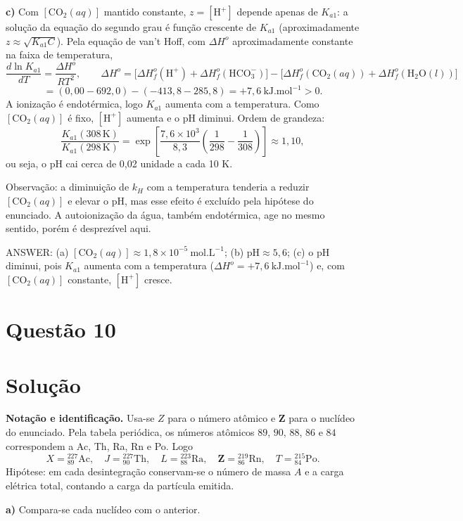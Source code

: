 \documentclass{article}%
\begin{document}
\textbf{c)} Com $[\text{CO}_2(aq)]$ mantido constante, $z=[\text{H}^+]$ depende apenas de $K_{a1}$: a solução da equação do segundo grau é função crescente de $K_{a1}$ (aproximadamente $z\approx\sqrt{K_{a1}C}$). Pela equação de van't Hoff, com $\Delta H^o$ aproximadamente constante na faixa de temperatura,
\[
\frac{d\ln K_{a1}}{dT}=\frac{\Delta H^o}{RT^2},\qquad \Delta H^o=\big[\Delta H^o_f(\text{H}^+)+\Delta H^o_f(\text{HCO}_3^-)\big]-\big[\Delta H^o_f(\text{CO}_2(aq))+\Delta H^o_f(\text{H}_2\text{O}(l))\big]
\]
\[
=(0{,}00-692{,}0)-(-413{,}8-285{,}8)=+7{,}6\ \text{kJ.mol}^{-1}>0.
\]
A ionização é endotérmica, logo $K_{a1}$ aumenta com a temperatura. Como $[\text{CO}_2(aq)]$ é fixo, $[\text{H}^+]$ aumenta e o pH diminui. Ordem de grandeza:
\[
\frac{K_{a1}(308\,\text{K})}{K_{a1}(298\,\text{K})}=\exp\!\left[\frac{7{,}6\times10^{3}}{8{,}3}\left(\frac{1}{298}-\frac{1}{308}\right)\right]\approx1{,}10,
\]
ou seja, o pH cai cerca de 0,02 unidade a cada 10 K.

Observação: a diminuição de $k_H$ com a temperatura tenderia a reduzir $[\text{CO}_2(aq)]$ e elevar o pH, mas esse efeito é excluído pela hipótese do enunciado. A autoionização da água, também endotérmica, age no mesmo sentido, porém é desprezível aqui.

ANSWER: (a) $[\text{CO}_2(aq)]\approx1{,}8\times10^{-5}\ \text{mol.L}^{-1}$; (b) $\text{pH}\approx5{,}6$; (c) o pH diminui, pois $K_{a1}$ aumenta com a temperatura ($\Delta H^o=+7{,}6\ \text{kJ.mol}^{-1}$) e, com $[\text{CO}_2(aq)]$ constante, $[\text{H}^+]$ cresce.%
\newpage%
\section*{Questão 10}

\section*{Solução}

\textbf{Notação e identificação.} Usa-se $Z$ para o número atômico e $\mathbf{Z}$ para o nuclídeo do enunciado. Pela tabela periódica, os números atômicos $89$, $90$, $88$, $86$ e $84$ correspondem a Ac, Th, Ra, Rn e Po. Logo
\[
X={}^{227}_{89}\mathrm{Ac},\quad J={}^{227}_{90}\mathrm{Th},\quad L={}^{223}_{88}\mathrm{Ra},\quad \mathbf{Z}={}^{219}_{86}\mathrm{Rn},\quad T={}^{215}_{84}\mathrm{Po}.
\]
Hipótese: em cada desintegração conservam-se o número de massa $A$ e a carga elétrica total, contando a carga da partícula emitida.

\textbf{a)} Compara-se cada nuclídeo com o anterior.
\end{document}
